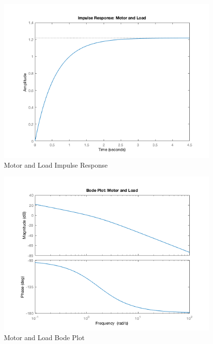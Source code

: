 \documentclass[12pt]{article}
\begin{document}
\begin{figure}[H]
\begin{center}
	\includegraphics[width=\textwidth]{./img/MotorImpulse.png}
	\caption{\label{fig:motorimpulse}Motor and Load Impulse Response}
\end{center}
\end{figure}

\begin{figure}[H]
\begin{center}
	\includegraphics[width=\textwidth]{./img/MotorBode.png}
	\caption{\label{fig:motorbode}Motor and Load Bode Plot}
\end{center}
\end{figure}
\end{document}
